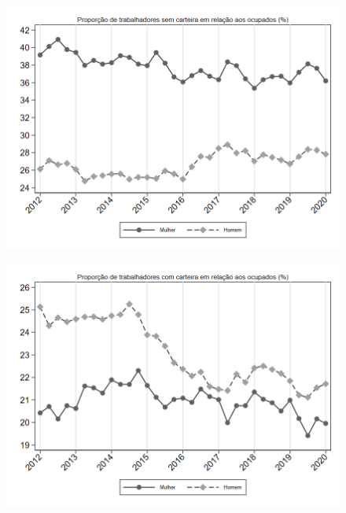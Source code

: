 \begin{frame}[label=_composicao_demografica_genero_prop_empregadoSC]{}
\textit{\hyperlink{_composicao_demografica_genero}{}}
\begin{figure}
  \centering
  \includegraphics[width=1.0\linewidth]{../../analysis/output/composicao_demografica/genero/_composicao_demografica_genero_prop_empregadoSC.png}
  \caption{}
  \label{fig:_composicao_demografica_genero_prop_empregadoSC}
\end{figure}
\end{frame}

\begin{frame}[label=_composicao_demografica_genero_prop_empregadoCC]{}
\textit{\hyperlink{_composicao_demografica_genero}{}}
\begin{figure}
  \centering
  \includegraphics[width=1.0\linewidth]{../../analysis/output/composicao_demografica/genero/_composicao_demografica_genero_prop_empregadoCC.png}
  \caption{}
  \label{fig:_composicao_demografica_genero_prop_empregadoCC}
\end{figure}
\end{frame}

